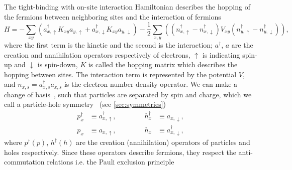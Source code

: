 The tight-binding with on-site interaction Hamiltonian describes the hopping of the fermions between neighboring sites and the interaction of fermions
\begin{equation}
    H = - \sum_{xy} \left( a^\dagger_{x,\uparrow} K_{xy} a_{y,\uparrow} + a^\dagger_{x,\downarrow} K_{xy} a_{y,\downarrow} \right) - \frac{1}{2} \sum_{x,y} \left( (n^\dagger_{x,\uparrow} - n^\dagger_{x,\downarrow}) V_{xy} (n^\dagger_{y,\uparrow} - n^\dagger_{y,\downarrow}) \right),
\end{equation}
where the first term is the kinetic and the second is the interaction; $a^\dagger$, $a$ are the creation and annihilation operators respectively of electrons, $\uparrow$ is indicating spin-up and $\downarrow$ is spin-down, $K$ is called the hopping matrix which describes the hopping between sites. The interaction term is represented by the potential $V$, and $n_{x,s} = a^\dagger_{x,s} a_{x,s}$ is the electron number density operator. We can make a change of basis~\cite{avoiding}, such that particles are separated by spin and charge, which we call a particle-hole symmetry~\cite{phex1} (see \cref{sec:symmetries})
\begin{equation}
    \begin{aligned}
        p^\dagger_x & \equiv a^\dagger_{x,\uparrow}, \qquad\qquad h^\dagger_x & \equiv a_{x,\downarrow}, \\
        p_x & \equiv a_{x,\uparrow}, \qquad\qquad h_x & \equiv a^\dagger_{x,\downarrow},
    \end{aligned}
    \label{eq:ph-switch}
\end{equation}
where $p^\dagger (p)$, $h^\dagger (h)$ are the creation (annihilation) operators of particles and holes respectively. Since these operators describe fermions, they respect the anti-commutation relations i.e. the Pauli exclusion principle

